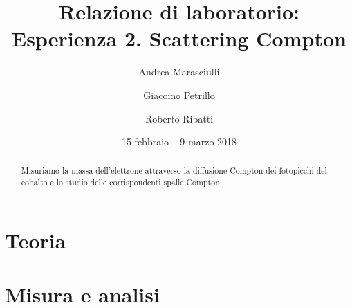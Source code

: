 \documentclass[a4paper]{article}
\title{Relazione di laboratorio:\\
Esperienza 2. Scattering Compton}
\author{Andrea Marasciulli
\and Giacomo Petrillo
\and Roberto Ribatti}
\date{15 febbraio -- 9 marzo 2018}
\begin{document}
\maketitle

\begin{abstract}
	Misuriamo la massa dell'elettrone attraverso la diffusione Compton dei fotopicchi del cobalto e lo studio delle corrispondenti spalle Compton.
\end{abstract}

{\small \tableofcontents}

\newpage

%

\section{Teoria}



\section{Misura e analisi}





%
\end{document}
